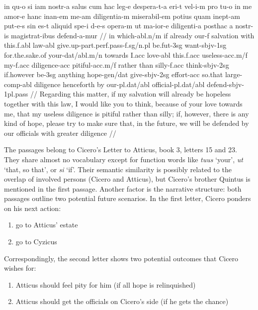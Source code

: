 \ex[exno=PROIEL 77314]
	\par
	\begingl
		\gla in qu-o si iam nostr-a salus cum hac leg-e despera-t-a eri-t vel-i-m pro tu-o in me amor-e hanc inan-em me-am diligentia-m miserabil-em potius quam inept-am put-e-s sin es-t aliquid spe-i d-e-s opera-m ut ma-ior-e diligenti-a posthac a nostr-is magistrat-ibus defend-a-mur //
		\glb in which-{\sc abl.n/m} if already our-{\sc f} salvation with this.{\sc f.abl} law-{\sc abl} give.up-{\sc part.perf.pass-f.sg/n.pl} be.{\sc fut-3sg} want-{\sc sbjv-1sg} for.the.sake.of your-{\sc dat/abl.m/n} towards I.{\sc acc} love-{\sc abl} this.{\sc f.acc} useless-{\sc acc.m/f} my-{\sc f.acc} diligence-{\sc acc} pitiful-{\sc acc.m/f} rather than silly-{\sc f.acc} think-{\sc sbjv-2sg} if.however be-{\sc 3sg} anything hope-{\sc gen/dat} give-{\sc sbjv-2sg} effort-{\sc acc} so.that large-{\sc comp-abl} diligence henceforth by our-{\sc pl.dat/abl} official-{\sc pl.dat/abl} defend-{\sc sbjv-1pl.pass} //
		\glft Regarding this matter, if my salvation will already be hopeless together with this law, I would like you to think, because of your love towards me, that my useless diligence is pitiful rather than silly; if, however, there is any kind of hope, please try to make sure that, in the future, we will be defended by our officials with greater diligence //
	\endgl
\xe
\vspace{10pt}

The passages belong to Cicero's Letter to Atticus, book 3, letters 15 and 23. They share almost no vocabulary except for function words like \textit{tuus} `your', \textit{ut} `that, so that', or \textit{si} `if'. Their semantic similarity is possibly related to the overlap of involved persons (Cicero and Atticus), but Cicero's brother Quintus is mentioned in the first passage. Another factor is the narrative structure: both passages outline two potential future scenarios. In the first letter, Cicero ponders on his next action:
\begin{enumerate}[label=(\alph*)]
	\item go to Atticus' estate
	\item go to Cyzicus
\end{enumerate}
Correspondingly, the second letter shows two potential outcomes that Cicero wishes for:
\begin{enumerate}[label=(\alph*)]
	\item Atticus should feel pity for him (if all hope is relinquished)
	\item Atticus should get the officials on Cicero's side (if he gets the chance)
\end{enumerate}

